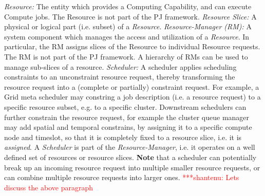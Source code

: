 \documentclass[conference,final]{IEEEtran}
\newcommand{\jhanote}[1]{ {\textcolor{red} { ***shantenu: #1 }}}
\newcommand{\alnote}[1]{ {\textcolor{blue} { ***andre: #1 }}}
\newcommand{\alnote}[1]{}
\newcommand{\jhanote}[1]{}
\begin{document}
\emph{Resource:} The entity which provides a Computing Capability, and
can execute Compute jobs.  The Resource is not part of the PJ
framework. \emph{Resource Slice:} A physical or logical part (i.e.
subset) of a \emph{Resource}. \emph{Resource-Manager (RM):} A system
component which manages the access and utilization of a
\emph{Resource}.  In particular, the RM assigns slices of the Resource
to individual Resource requests.  The RM is not part of the PJ
framework.  A hierarchy of RMs can be used to manage sub-slices of a
resource.  \emph{Scheduler:} A scheduler applies scheduling
constraints to an unconstraint resource request, thereby transforming
the resource request into a (complete or partially) constraint
request.  For example, a Grid meta scheduler may constring a job
description (i.e. a resource request) to a specific resource subset,
e.g. to a specific cluster.  Downstream schedulers can further
constrain the resource request, for example the cluster queue manager
may add spatial and temporal constrains, by assigning it to a specific
compute node and timeslot, so that it is completely fixed to a
resource slice, i.e. it is \emph{assigned}.  A \emph{Scheduler} is
part of the \emph{Resource-Manager}, i.e. it operates on a well
defined set of resources or resource slices. \textbf{Note} that a
scheduler can potentially break up an incoming resource request into
multiple smaller resource requests, or can combine multiple resource
requests into larger ones. \jhanote{Lets discuss the above paragraph}
 




\end{document}
